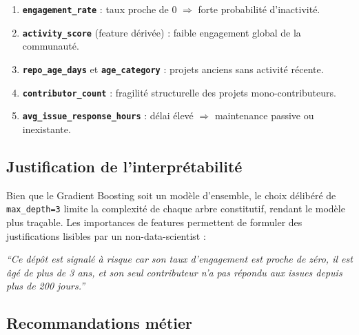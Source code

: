 \documentclass[12pt,a4paper]{article}
\begin{document}
\begin{enumerate}
  \item \textbf{\texttt{engagement\_rate}} : taux proche de 0 $\Rightarrow$ forte probabilité
    d'inactivité.
  \item \textbf{\texttt{activity\_score}} (feature dérivée) : faible engagement global de la
    communauté.
  \item \textbf{\texttt{repo\_age\_days}} et \textbf{\texttt{age\_category}} : projets anciens
    sans activité récente.
  \item \textbf{\texttt{contributor\_count}} : fragilité structurelle des projets
    mono-contributeurs.
  \item \textbf{\texttt{avg\_issue\_response\_hours}} : délai élevé $\Rightarrow$ maintenance
    passive ou inexistante.
\end{enumerate}

\subsection{Justification de l'interprétabilité}

Bien que le Gradient Boosting soit un modèle d'ensemble, le choix délibéré de \texttt{max\_depth=3}
limite la complexité de chaque arbre constitutif, rendant le modèle plus traçable. Les importances de
features permettent de formuler des justifications lisibles par un non-data-scientist :

\begin{center}
  \textit{``Ce dépôt est signalé à risque car son taux d'engagement est proche de zéro, il est âgé
  de plus de 3 ans, et son seul contributeur n'a pas répondu aux issues depuis plus de 200 jours.''}
\end{center}

\subsection{Recommandations métier}
\end{document}

